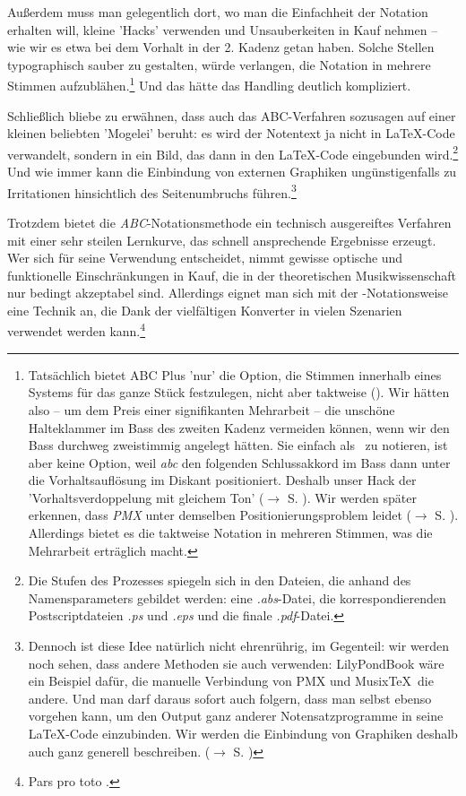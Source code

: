 Außerdem muss man gelegentlich dort, wo man die Einfachheit der Notation
erhalten will, kleine 'Hacks' verwenden und Unsauberkeiten in Kauf nehmen -- wie
wir es etwa bei dem Vorhalt in der 2. Kadenz getan haben. Solche Stellen
typographisch sauber zu gestalten, würde verlangen, die Notation in mehrere
Stimmen aufzublähen.\footnote{Tatsächlich bietet ABC Plus 'nur' die Option, die
Stimmen innerhalb eines Systems für das ganze Stück festzulegen, nicht aber
taktweise (\cite[vgl.][49f]{Gonzato2018b}). Wir hätten also -- um dem Preis einer
signifikanten Mehrarbeit -- die unschöne Halteklammer im Bass des zweiten Kadenz
vermeiden können, wenn wir den Bass durchweg zweistimmig angelegt hätten. Sie
einfach als \Halb\ zu notieren, ist aber keine Option, weil \textit{abc} den
folgenden Schlussakkord im Bass dann unter die Vorhaltsauflösung im Diskant
positioniert. Deshalb unser Hack der 'Vorhaltsverdoppelung mit gleichem Ton'
($\rightarrow$ S. ). Wir werden später erkennen, dass
\textit{PMX} unter demselben Positionierungsproblem leidet ($\rightarrow$ S.
). Allerdings bietet es die taktweise Notation in
mehreren Stimmen, was die Mehrarbeit erträglich macht.
} Und das hätte das Handling deutlich kompliziert.

Schließlich bliebe zu erwähnen, dass auch das ABC-Verfahren sozusagen auf einer
kleinen beliebten 'Mogelei' beruht: es wird der Notentext ja nicht in
\LaTeX-Code verwandelt, sondern in ein Bild, das dann in den \LaTeX-Code
eingebunden wird.\footnote{Die Stufen des Prozesses spiegeln sich in den Dateien,
die anhand des Namensparameters gebildet werden: eine \textit{.abs}-Datei, die
korrespondierenden Postscriptdateien \textit{.ps} und \textit{.eps} und die
finale \textit{.pdf}-Datei.} Und wie immer kann die Einbindung von externen
Graphiken ungünstigenfalls zu Irritationen hinsichtlich des Seitenumbruchs
führen.\footnote{Dennoch ist diese Idee natürlich nicht ehrenrührig, im
Gegenteil: wir werden noch sehen, dass andere Methoden sie auch verwenden:
LilyPondBook wäre ein Beispiel dafür, die manuelle Verbindung von PMX und
Musix\TeX\ die andere. Und man darf daraus sofort auch folgern, dass man selbst
ebenso vorgehen kann, um den Output ganz anderer Notensatzprogramme in seine
\LaTeX-Code einzubinden. Wir werden die Einbindung von Graphiken deshalb auch
ganz generell beschreiben.
($\rightarrow$ S. \pageref{IncludeGraphics})}\label{AbcGraphics}

Trotzdem bietet die \textit{ABC}-Notationsmethode ein technisch ausgereiftes
Verfahren mit einer sehr steilen Lernkurve, das schnell ansprechende Ergebnisse
erzeugt. Wer sich für seine Verwendung entscheidet, nimmt gewisse optische und
funktionelle Einschränkungen in Kauf, die in der theoretischen Musikwissenschaft
nur bedingt akzeptabel sind. Allerdings eignet man sich mit der
-Notationsweise eine Technik an, die Dank der vielfältigen Konverter in
vielen Szenarien verwendet werden kann.\footnote{Pars pro toto
\cite[vgl.][\nopage wp]{Rosen2018a}.}
% 

